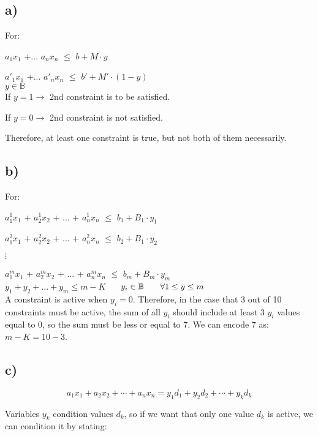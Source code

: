 \documentclass[11pt, oneside]{article}   	%
\begin{document}
\subsection{a)}
For:

$a_1$$x_1$ +... $a_n$$x_n$ $\leq$ $b + M \cdot y$

$a'_1$$x_1$ +... $a'_n$$x_n$ $\leq$ $b' + M' \cdot (1-y)$\\

$y \in \mathbb{B}$ \\

If $y = 1 \rightarrow$ 2nd constraint is to be satisfied.

If $y = 0 \rightarrow$ 2nd constraint is not satisfied.

Therefore, at least one constraint is true, but not both of them necessarily.
\subsection{b)}
For: 

$a^1_1$$x_1$ + $a^1_2$$x_2$ + ... + $a^1_n$$x_n$ $\leq$ $b_1 + B_1 \cdot y_1$

$a^2_1$$x_1$ + $a^2_2$$x_2$ + ... + $a^2_n$$x_n$ $\leq$ $b_2 + B_1 \cdot y_2$

$\vdots$

$a^m_1$$x_1$ + $a^m_2$$x_2$ + ... + $a^m_n$$x_n$ $\leq$ $b_m + B_m \cdot y_m$\\

$y_1 + y_2 + ... + y_m \leq m - K$ $\hspace{5 mm} y_i \in \mathbb{B}$ $\hspace{5 mm} \forall 1 \leq y \leq m$\\

A constraint is active when $y_i  = 0$. Therefore, in the case that 3 out of 10 constraints must be active, the sum of all $y_i$ should include at least 3 $y_i$ values equal to $0$, so the sum must be less or equal to $7$. We can encode $7$ as: \textbf{$m - K = 10 - 3$}.\\

\subsection{c)}

$$a_1 x_1 + a_2 x_2 + \cdots + a_n x_n = y_1 d_1 + y_2 d_2 + \cdots + y_k d_k $$

Variables $y_k$ condition values $d_k$, so if we want that only one value $d_k$ is active, we can condition it by stating:
\end{document}
